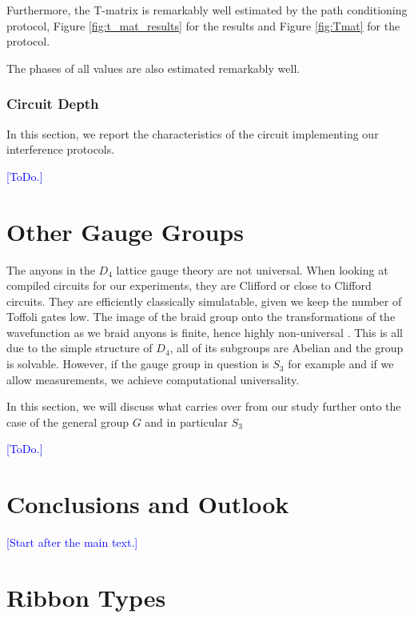 \documentclass[two column]{article}
\newcommand{\jovan}[1]{\textcolor{blue}{[#1]}}
\begin{document}
Furthermore, the T-matrix is remarkably well estimated by the path conditioning protocol, Figure \ref{fig:t_mat_results} for the results and Figure \ref{fig:Tmat} for the protocol.

The phases of all values are also estimated remarkably well.

\subsubsection{Circuit Depth}

In this section, we report the characteristics of the circuit implementing our interference protocols.

\jovan{ToDo.}

\section{Other Gauge Groups}

The anyons in the $D_4$ lattice gauge theory are not universal. 
When looking at compiled circuits for our experiments, they are Clifford or close to Clifford circuits.
They are efficiently classically simulatable, given we keep the number of Toffoli gates low.
The image of the braid group onto the transformations of the wavefunction as we braid anyons is finite, hence highly non-universal \cite{}.
This is all due to the simple structure of $D_4$, all of its subgroups are Abelian and the group is solvable.
However, if the gauge group in question is $S_3$ for example and if we allow measurements, we achieve computational universality.

In this section, we will discuss what carries over from our study further onto the case of the general group $G$ and in particular $S_3$

\jovan{ToDo.}



\section{Conclusions and Outlook}

\jovan{Start after the main text.}




\FloatBarrier
\onecolumn
\appendix

\section{Ribbon Types}\label{app:ribs}
\end{document}
